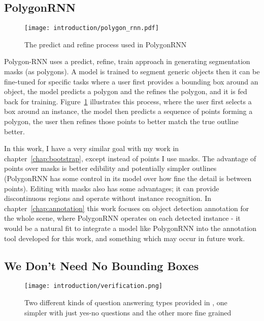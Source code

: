 \subsection {PolygonRNN \cite{Castrejon2017}}

\begin{figure}[h]
  \centering
  \texttt{[image: introduction/polygon\_rnn.pdf]}
  \caption{The predict and refine process used in PolygonRNN \cite{Castrejon2017}}  
  \label{fig:polygon_rnn}
\end{figure}


Polygon-RNN \cite{Castrejon2017} uses a predict, refine, train approach in generating segmentation masks (as polygons). A model is trained to segment generic objects then it can be fine-tuned for specific tasks where a user first provides a bounding box around an object, the model predicts a polygon and the refines the polygon, and it is fed back for training. Figure~\ref{fig:polygon_rnn} illustrates this process, where the user first selects a box around an instance, the model then predicts a sequence of points forming a polygon, the user then refines those points to better match the true outline better.

In this work, I have a very similar goal with my work in chapter~\ref{chap:bootstrap}, except instead of points I use masks. The advantage of points over masks is better edibility and potentially simpler outlines (PolygonRNN has some control in its model over how fine the detail is between points). Editing with masks also has some advantages; it can provide discontinuous regions and operate without instance recognition. In chapter~\ref{chap:annotation} this work focuses on object detection annotation for the whole scene, where PolygonRNN operates on each detected instance - it would be a natural fit to integrate a model like PolygonRNN into the annotation tool developed for this work, and something which may occur in future work.


\subsection {We Don't Need No Bounding Boxes}

\begin{figure}[h]
  \centering
  \texttt{[image: introduction/verification.png]}
  \caption{Two different kinds of question answering types provided in \cite{Papadopoulos2016}, one simpler with just yes-no questions and the other more fine grained}
  \label{fig:verification}
\end{figure}

